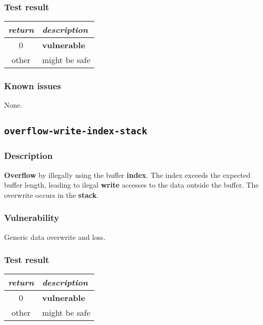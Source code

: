 \documentclass[a4paper]{book}
\begin{document}
\subsubsection{Test result}
\begin{tabular}{cl}
  \toprule
  \emph{return}  & \emph{description} \\
  \midrule
  0              & \textbf{vulnerable} \\
  other          & might be safe \\
  \bottomrule
\end{tabular}

\subsubsection{Known issues}

None.

\newpage

\subsection{\texttt{overflow-write-index-stack}}\label{test-overflow-write-index-stack}

\subsubsection{Description}

\textbf{Overflow} by illegally using the buffer \textbf{index}.
The index exceeds the expected buffer length,
leading to ilegal \textbf{write} accesses to the data outside the buffer.
The overwrite occurs in the \textbf{stack}.

\subsubsection{Vulnerability}
Generic data overwrite and loss.

\subsubsection{Test result}
\begin{tabular}{cl}
  \toprule
  \emph{return}  & \emph{description} \\
  \midrule
  0              & \textbf{vulnerable} \\
  other          & might be safe \\
  \bottomrule
\end{tabular}
\end{document}
